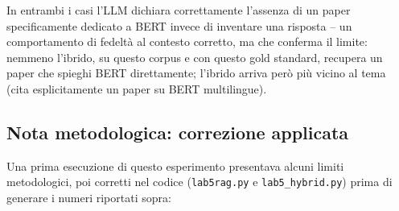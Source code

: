 \documentclass[12pt,a4paper]{article}
\begin{document}
In entrambi i casi l'LLM dichiara correttamente l'assenza di un paper specificamente dedicato a BERT invece di inventare una risposta -- un comportamento di fedelt\`a al contesto corretto, ma che conferma il limite: nemmeno l'ibrido, su questo corpus e con questo gold standard, recupera un paper che spieghi BERT direttamente; l'ibrido arriva per\`o pi\`u vicino al tema (cita esplicitamente un paper su BERT multilingue).

\subsection{Nota metodologica: correzione applicata}
\label{sec:nota-metodologica}

Una prima esecuzione di questo esperimento presentava alcuni limiti metodologici, poi corretti nel codice (\texttt{lab5rag.py} e \texttt{lab5\_hybrid.py}) prima di generare i numeri riportati sopra:
\end{document}

